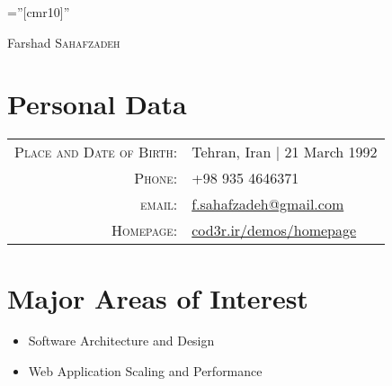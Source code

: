 \documentclass[a4paper,10pt]{article}
\begin{document}

\pagestyle{empty} %

\font\fb=''[cmr10]'' %

\par{\centering
		{\Huge Farshad \textsc{Sahafzadeh}
	}\bigskip\par}

\section{Personal Data}

\begin{tabular}{rl}
    \textsc{Place and Date of Birth:} & Tehran, Iran  | 21 March 1992 \\
    \textsc{Phone:}     & +98 935 4646371\\
    \textsc{email:}     & \href{mailto:f.sahafzadeh@gmail.com}{f.sahafzadeh@gmail.com}\\
    \textsc{Homepage:}     & \href{http://cod3r.ir/demos/homepage}{cod3r.ir/demos/homepage}
\end{tabular}

\section{Major Areas of Interest}
\begin{itemize}
  \item Software Architecture and Design
  \item Web Application Scaling and Performance
\end{itemize}

\end{document}
